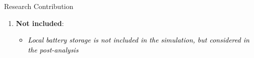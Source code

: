 \documentclass[10pt, aspectration=169]{beamer}
\begin{document}
\begin{frame}{}
\begin{block}{Research Contribution}
\begin{enumerate}
\begin{itemize}
            \item \textcolor{black}{\textit{2nd-best solution: Simple subsidy adjustments might delay grid congestion for a more efficient outcome. }}
        \end{itemize}
    \item \textbf{Not included}: 
        \begin{itemize}
            \item \textcolor{black}{\textit{Local battery storage is not included in the simulation, but considered in the post-analysis}}
        \end{itemize}


    \end{enumerate}
\end{block}

\end{frame}
\end{document}
